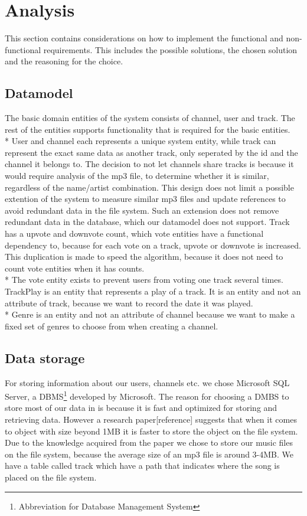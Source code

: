 \documentclass[a4paper,11pt,report]{article}
\begin{document}
\section{Analysis}
This section contains considerations on how to implement the functional and non-functional requirements. This includes the possible solutions, the chosen solution and the reasoning for the choice.

\subsection{Datamodel}
The basic domain entities of the system consists of channel, user and track. The rest of the entities supports functionality that is required for the basic entities. \\*
User and channel each represents a unique system entity, while track can represent the exact same data as another track, only seperated by the id and the channel it belongs to.
The decision to not let channels share tracks is because it would require analysis of the mp3 file, to determine whether it is similar, regardless of the name/artist combination.
This design does not limit a possible extention of the system to measure similar mp3 files and update references to avoid redundant data in the file system.
Such an extension does not remove redundant data in the database, which our datamodel does not support. Track has a upvote and downvote count, which vote entities have a functional dependency to,
because for each vote on a track, upvote or downvote is increased. This duplication is made to speed the algorithm, because it does not need to count vote entities when it has counts. \\*
The vote entity exists to prevent users from voting one track several times.
TrackPlay is an entity that represents a play of a track. It is an entity and not an attribute of track, because we want to record the date it was played. \\*
Genre is an entity and not an attribute of channel because we want to make a fixed set of genres to choose from when creating a channel. 

\subsection{Data storage}
For storing information about our users, channels etc. we chose Microsoft SQL Server, a DBMS\footnote[1]{Abbreviation for Database Management System} developed by Microsoft. The reason for choosing a DMBS to store most of our data in is because it is fast and optimized for storing and retrieving data. However a research paper[reference] suggests that when it comes to object with size beyond 1MB it is faster to store the object on the file system. Due to the knowledge acquired from the paper we chose to store our music files on the file system, because the average size of an mp3 file is around 3-4MB. We have a table called track which have a path that indicates where the song is placed on the file system.
\end{document}
